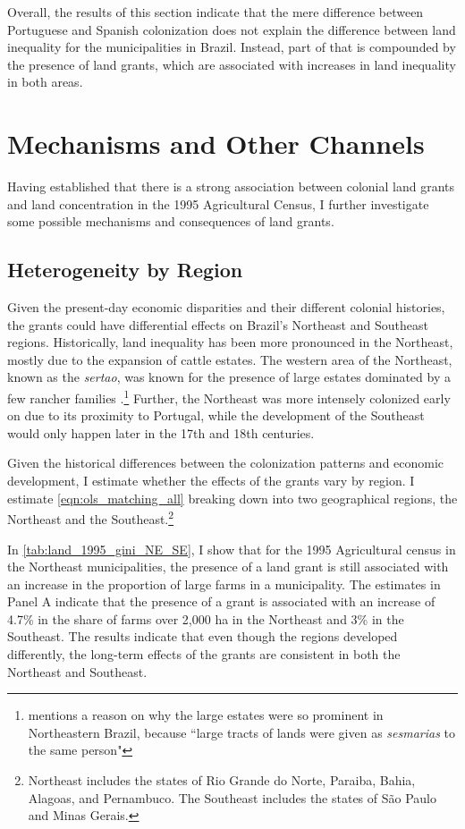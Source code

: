 \documentclass[11pt]{article}
\begin{document}
Overall, the results of this section indicate that the mere difference between Portuguese and Spanish colonization does not explain the difference between land inequality for the municipalities in Brazil.
Instead, part of that is compounded by the presence of land grants, which are associated with increases in land inequality in both areas.

\section{Mechanisms and Other Channels}
\label{sec:mechanisms}

Having established that there is a strong association between colonial land grants and land concentration in the 1995 Agricultural Census, I further investigate some possible mechanisms and consequences of land grants. 

\subsection{Heterogeneity by Region}

Given the present-day economic disparities and their different colonial histories, the grants could have differential effects on Brazil's Northeast and Southeast regions. 
Historically, land inequality has been more pronounced in the Northeast, mostly due to the expansion of cattle estates. 
The western area of the Northeast, known as the \textit{sertao}, was known for the presence of large estates dominated by a few rancher families \parencite[p.~460-461]{Bethell1984-of}.\footnote{\textcite[p.~53]{Da_Costa_Porto1979-dz} mentions a reason on why the large estates were so prominent in Northeastern Brazil, because ``large tracts of lands were given as \textit{sesmarias} to the same person"}
Further, the Northeast was more intensely colonized early on due to its proximity to Portugal, while the development of the Southeast would only happen later in the 17th and 18th centuries. 

Given the historical differences between the colonization patterns and economic development, I estimate whether the effects of the grants vary by region.
I estimate \autoref{eqn:ols_matching_all} breaking down into two geographical regions, the Northeast and the Southeast.\footnote{Northeast includes the states of Rio Grande do Norte, Paraiba, Bahia, Alagoas, and Pernambuco. The Southeast includes the states of São Paulo and Minas Gerais.}


In \autoref{tab:land_1995_gini_NE_SE}, I show that for the 1995 Agricultural census in the Northeast municipalities, the presence of a land grant is still associated with an increase in the proportion of large farms in a municipality. 
The estimates in Panel A indicate that the presence of a grant is associated with an increase of 4.7\% in the share of farms over 2,000 ha in the Northeast and 3\% in the Southeast.
The results indicate that even though the regions developed differently, the long-term effects of the grants are consistent in both the Northeast and Southeast.
\end{document}
